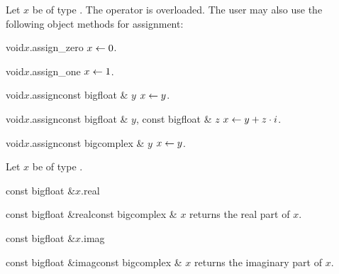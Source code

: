 


\ASGN

Let $x$ be of type .  The operator \code{=} is overloaded.  The user may also
use the following object methods for assignment:

\begin{fcode}{void}{$x$.assign_zero}{}
  $x \leftarrow 0$.
\end{fcode}

\begin{fcode}{void}{$x$.assign_one}{}
  $x \leftarrow 1$.
\end{fcode}

\begin{fcode}{void}{$x$.assign}{const bigfloat & $y$}
  $x \leftarrow y$.
\end{fcode}

\begin{fcode}{void}{$x$.assign}{const bigfloat & $y$, const bigfloat & $z$}
  $x \leftarrow y + z \cdot i$.
\end{fcode}

\begin{fcode}{void}{$x$.assign}{const bigcomplex & $y$}
  $x \leftarrow y$.
\end{fcode}



\ACCS

Let $x$ be of type .

\begin{cfcode}{const bigfloat &}{$x$.real}{}\end{cfcode}
\begin{fcode}{const bigfloat &}{real}{const bigcomplex & $x$}
  returns the real part of $x$.
\end{fcode}

\begin{cfcode}{const bigfloat &}{$x$.imag}{}\end{cfcode}
\begin{fcode}{const bigfloat &}{imag}{const bigcomplex & $x$}
  returns the imaginary part of $x$.
\end{fcode}


